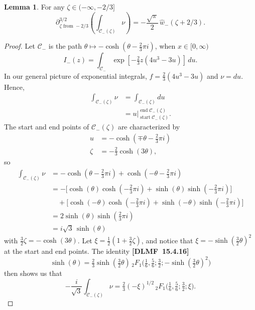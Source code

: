 \documentclass{article}
\theoremstyle{definition}
\newtheorem{lemma}[definition]{Lemma}
\begin{document}
\begin{lemma}\label{claim 3}
For any $\zeta\in (-\infty,-2/3]$
\[ \partial^{3/2}_{\zeta \text{ from } -2/3} \left( \int_{\mathcal{C}_-(\zeta)} \nu \right) = - \frac{\sqrt{\pi}}{2}\,\hat{w}_-(\zeta+2/3). \]
\end{lemma}
\begin{proof}
Let $\mathcal{C}_-$ is the path $\theta \mapsto -\cosh(\theta - \tfrac{2}{3}\pi i)$, when $x \in [0, \infty)$ 
\[ I_-(z) = \int_{\mathcal{C}_-} \exp\left[-\tfrac{2}{3} z \left(4u^3 - 3u\right)\right]\,du. \]
In our general picture of exponential integrals, $f = \tfrac{2}{3}(4u^3 - 3u)$ and $\nu = du$. Hence,
\begin{align*}
\int_{\mathcal{C}_-(\zeta)} \nu & = \int_{\mathcal{C}_-(\zeta)} du \\
& = u \Big|_{\operatorname{start} \mathcal{C}_-(\zeta)}^{\operatorname{end} \mathcal{C}_-(\zeta)}.
\end{align*}
The start and end points of $\mathcal{C}_-(\zeta)$ are characterized by
\begin{align*}
u & = -\cosh(\mp\theta - \tfrac{2}{3}\pi i) \\
\zeta & = -\tfrac{2}{3} \cosh(3\theta),
\end{align*}
so
\begin{align*}
\int_{\mathcal{C}_-(\zeta)} \nu & =- \cosh(\theta - \tfrac{2}{3}\pi i) + \cosh(-\theta - \tfrac{2}{3}\pi i) \\
& =- \big[\cosh(\theta) \cosh(-\tfrac{2}{3}\pi i) + \sinh(\theta) \sinh(-\tfrac{2}{3}\pi i)\big] \\
& \quad + \big[\cosh(-\theta) \cosh(-\tfrac{2}{3}\pi i) + \sinh(-\theta) \sinh(-\tfrac{2}{3}\pi i)\big] \\
& = 2\sinh(\theta) \sinh(\tfrac{2}{3}\pi i) \\
& = i\sqrt{3}\,\sinh(\theta)
\end{align*}
with $\tfrac{3}{2} \zeta = -\cosh(3\theta)$. Let $\xi = \tfrac{1}{2}(1 + \tfrac{3}{2}\zeta)$, and notice that $\xi =- \sinh(\tfrac{3}{2} \theta)^2$ at the start and end points. The identity \textbf{[DLMF~15.4.16]}
\[ \sinh(\theta) = \tfrac{2}{3} \sinh(\tfrac{3}{2} \theta)\, {}_2F_1\big(\tfrac{1}{6}, \tfrac{5}{6}; \tfrac{3}{2}; -\sinh(\tfrac{3}{2} \theta)^2\big) \]
then shows us that
\[ -\frac{i}{\sqrt{3}} \int_{\mathcal{C}_-(\zeta)} \nu = \tfrac{2}{3} (-\xi)^{1/2}\, {}_2F_1\big(\tfrac{1}{6}, \tfrac{5}{6}; \tfrac{3}{2}; \xi\big). \]


\end{proof}
\end{document}
